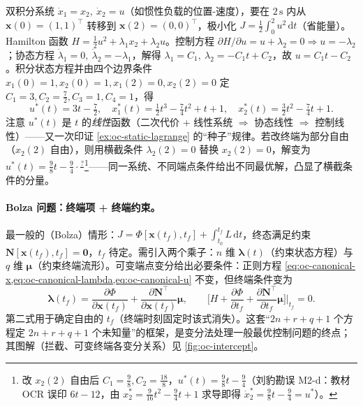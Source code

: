 \begin{example}[两端固定的最省能量控制]\label{ex:oc-double-int-fixed}
双积分系统 $\dot x_1=x_2,\ \dot x_2=u$（如惯性负载的位置-速度），要在 $2\,\mathrm s$ 内从 $\mathbf x(0)=(1,1)^\top$ 转移到 $\mathbf x(2)=(0,0)^\top$，极小化 $J=\tfrac12\int_0^2u^2\,\mathrm dt$（省能量）。Hamilton 函数 $H=\tfrac12u^2+\lambda_1x_2+\lambda_2u$。控制方程 $\partial H/\partial u=u+\lambda_2=0\Rightarrow u=-\lambda_2$；协态方程 $\dot\lambda_1=0,\ \dot\lambda_2=-\lambda_1$，解得 $\lambda_1=C_1,\ \lambda_2=-C_1t+C_2$，故 $u=C_1t-C_2$。积分状态方程并由四个边界条件 $x_1(0)=1,x_2(0)=1,x_1(2)=0,x_2(2)=0$ 定 $C_1=3,C_2=\tfrac72,C_3=1,C_4=1$，得
\begin{equation}
  u^*(t)=3t-\tfrac72,\quad x_1^*(t)=\tfrac12t^3-\tfrac74t^2+t+1,\quad x_2^*(t)=\tfrac32t^2-\tfrac74t+1.
  \label{eq:oc-double-int-sol}
\end{equation}
注意 $u^*(t)$ 是 $t$ 的\emph{线性}函数（二次代价 + 线性系统 $\Rightarrow$ 协态线性 $\Rightarrow$ 控制线性）——又一次印证 \cref{ex:oc-static-lagrange} 的“种子”规律。若改终端为部分自由（$x_2(2)$ 自由），则用横截条件 $\lambda_2(2)=0$ 替换 $x_2(2)=0$，解变为 $u^*(t)=\tfrac98t-\tfrac94\cdot\tfrac{?}{}$\footnote{改 $x_2(2)$ 自由后 $C_1=\tfrac98,C_2=\tfrac{18}{8}$，$u^*(t)=\tfrac98t-\tfrac94$（刘豹勘误 M2-d：教材 OCR 误印 $6t-12$，由 $x_2^*=\tfrac{9}{16}t^2-\tfrac94t+1$ 求导即得 $\dot x_2^*=\tfrac98t-\tfrac94=u^*$）。}——同一系统、不同端点条件给出不同最优解，凸显了横截条件的分量。
\end{example}

\paragraph{Bolza 问题：终端项 + 终端约束。}
最一般的（Bolza）情形：$J=\Phi[\mathbf x(t_f),t_f]+\int_{t_0}^{t_f}L\,\mathrm dt$，终态满足约束 $\mathbf N[\mathbf x(t_f),t_f]=\mathbf0$，$t_f$ 待定。需引入两个乘子：$n$ 维 $\boldsymbol\lambda(t)$（约束状态方程）与 $q$ 维 $\boldsymbol\mu$（约束终端流形）。可变端点变分给出必要条件：正则方程 \cref{eq:oc-canonical-x,eq:oc-canonical-lambda,eq:oc-canonical-u} 不变，但终端条件变为
\begin{equation}
  \boldsymbol\lambda(t_f)=\frac{\partial\Phi}{\partial\mathbf x(t_f)}+\frac{\partial\mathbf N^\top}{\partial\mathbf x(t_f)}\boldsymbol\mu,\qquad
  \Big[H+\frac{\partial\Phi}{\partial t_f}+\frac{\partial\mathbf N^\top}{\partial t_f}\boldsymbol\mu\Big]\Big|_{t_f}=0.
  \label{eq:oc-bolza-terminal}
\end{equation}
第二式用于确定自由的 $t_f$（终端时刻固定时该式消失）。这套“$2n+r+q+1$ 个方程定 $2n+r+q+1$ 个未知量”的框架，是变分法处理一般最优控制问题的终点；其图解（拦截、可变终端各变分关系）见 \cref{fig:oc-intercept}。

